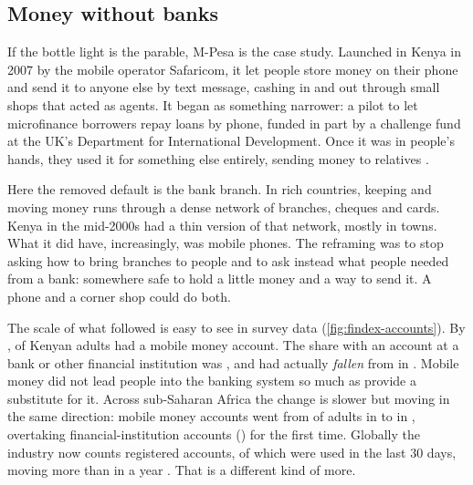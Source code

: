 \subsection{Money without banks}
\label{sec:money}

If the bottle light is the parable, M-Pesa is the case study. Launched in Kenya
in 2007 by the mobile operator Safaricom, it let people store money on their
phone and send it to anyone else by text message, cashing in and out through
small shops that acted as agents. It began as something narrower: a pilot to
let microfinance borrowers repay loans by phone, funded in part by a
challenge fund at the UK's Department for International Development. Once it
was in people's hands, they used it for something else entirely, sending money
to relatives \parencite{hughes2007}.

Here the removed default is the bank branch. In rich countries, keeping and
moving money runs through a dense network of branches, cheques and cards. Kenya
in the mid-2000s had a thin version of that network, mostly in towns. What it
did have, increasingly, was mobile phones. The reframing was to stop asking
how to bring branches to people and to ask instead what people needed from a
bank: somewhere safe to hold a little money and a way to send it. A phone and a
corner shop could do both.

The scale of what followed is easy to see in survey data
(\cref{fig:findex-accounts}). By \findexYear{}, \kenMobileMoney{} of Kenyan
adults had a mobile money account. The share with an account at a bank or
other financial institution was \kenBankAccount{}, and had actually
\emph{fallen} from \kenBankAccountPeak{} in \kenBankAccountPeakYear{}.
Mobile money did not lead people into the banking system so much as provide a
substitute for it. Across sub-Saharan Africa the change is slower but moving in
the same direction: mobile money accounts went from \ssaMobileMoneyStart{} of
adults in \ssaMobileMoneyStartYear{} to \ssaMobileMoney{} in \findexYear{},
overtaking financial-institution accounts (\ssaBankAccount{}) for the first
time. Globally the industry now counts \gsmaRegisteredAccounts{} registered
accounts, of which \gsmaActiveAccounts{} were used in the last 30 days, moving
more than \gsmaTransactionValue{} in a year \parencite{gsma2026sotir}. That is
a different kind of more.

